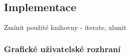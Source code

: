 \subsection{Implementace}



\begin{framed}
  Zmínit použité knihovny - iterate, xlunit
\end{framed}








\subsubsection{Grafické uživatelské rozhraní}
